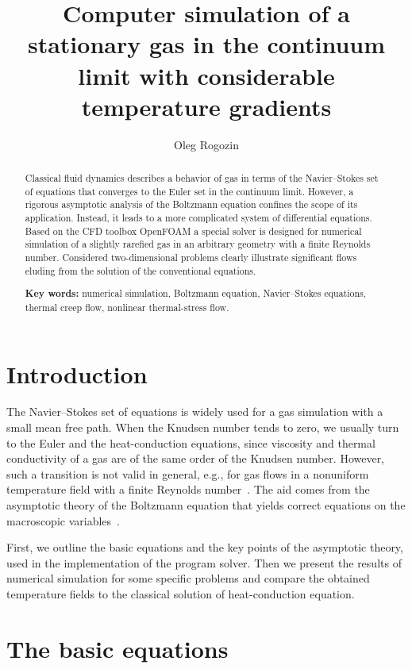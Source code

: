 \documentclass[english,a4paper,10pt]{article}
\title{
	Computer simulation of a stationary gas in the continuum limit with considerable temperature gradients
}
\author{Oleg Rogozin}
\date{}
\begin{document}
\maketitle
\begin{abstract}
	Classical fluid dynamics describes a behavior of gas in terms of the Navier--Stokes
	set of equations that converges to the Euler set in the continuum limit.
	However, a rigorous asymptotic analysis of the Boltzmann equation confines the scope of its
	application. Instead, it leads to a more complicated system of differential equations.
	Based on the CFD toolbox OpenFOAM\textregistered{} a special solver is designed for
	numerical simulation of a slightly rarefied gas in an arbitrary geometry with a finite Reynolds number.
	Considered two-dimensional problems clearly illustrate significant flows eluding
	from the solution of the conventional equations.

	\hbox{}\noindent \textbf{Key words:}
	numerical simulation, Boltzmann equation, Navier--Stokes equations, thermal creep flow,
	nonlinear thermal-stress flow.
\end{abstract}


\section{Introduction}

The Navier--Stokes set of equations is widely used for a gas simulation with a small mean free path.
When the Knudsen number tends to zero, we usually turn to the Euler and the heat-conduction equations,
since viscosity and thermal conductivity of a gas are of the same order of the Knudsen number.
However, such a transition is not valid in general, e.g., for gas flows
in a nonuniform temperature field with a finite Reynolds number~\cite{Kogan1976, Bobylev1996}.
The aid comes from the asymptotic theory of the Boltzmann equation
that yields correct equations on the macroscopic variables~\cite{Sone2002}.

First, we outline the basic equations and the key points of the asymptotic theory,
used in the implementation of the program solver.
Then we present the results of numerical simulation for some specific problems
and compare the obtained temperature fields to the classical solution
of heat-conduction equation.

\section{The basic equations}
\end{document}
